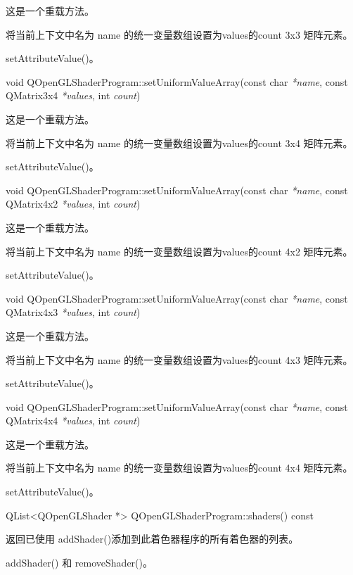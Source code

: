 这是一个重载方法。

将当前上下文中名为 name 的统一变量数组设置为values的count 3x3 矩阵元素。

\begin{seeAlso}
setAttributeValue()。
\end{seeAlso}

void QOpenGLShaderProgram::setUniformValueArray(const char \emph{*name}, const QMatrix3x4 \emph{*values}, int \emph{count})

这是一个重载方法。

将当前上下文中名为 name 的统一变量数组设置为values的count 3x4 矩阵元素。

\begin{seeAlso}
setAttributeValue()。
\end{seeAlso}

void QOpenGLShaderProgram::setUniformValueArray(const char \emph{*name}, const QMatrix4x2 \emph{*values}, int \emph{count})

这是一个重载方法。

将当前上下文中名为 name 的统一变量数组设置为values的count 4x2 矩阵元素。

\begin{seeAlso}
setAttributeValue()。
\end{seeAlso}

void QOpenGLShaderProgram::setUniformValueArray(const char \emph{*name}, const QMatrix4x3 \emph{*values}, int \emph{count})

这是一个重载方法。

将当前上下文中名为 name 的统一变量数组设置为values的count 4x3 矩阵元素。

\begin{seeAlso}
setAttributeValue()。
\end{seeAlso}

void QOpenGLShaderProgram::setUniformValueArray(const char \emph{*name}, const QMatrix4x4 \emph{*values}, int \emph{count})

这是一个重载方法。

将当前上下文中名为 name 的统一变量数组设置为values的count 4x4 矩阵元素。

\begin{seeAlso}
setAttributeValue()。
\end{seeAlso}

QList<QOpenGLShader *> QOpenGLShaderProgram::shaders() const

返回已使用 addShader()添加到此着色器程序的所有着色器的列表。

\begin{seeAlso}
addShader() 和 removeShader()。
\end{seeAlso}

